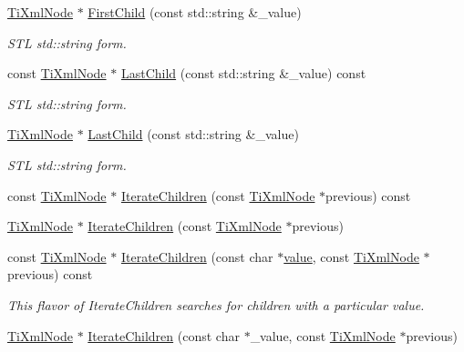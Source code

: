 \begin{DoxyCompactItemize}
\hyperlink{class_ti_xml_node}{Ti\+Xml\+Node} $\ast$ \hyperlink{class_ti_xml_node_a10d2669ccb5e29e02fcb0e4408685ef6}{First\+Child} (const std\+::string \&\+\_\+value)
\begin{DoxyCompactList}\small\item\em S\+TL std\+::string form. \end{DoxyCompactList}\item 
const \hyperlink{class_ti_xml_node}{Ti\+Xml\+Node} $\ast$ \hyperlink{class_ti_xml_node_a96b721f14d5393dac70a0eff0d08520e}{Last\+Child} (const std\+::string \&\+\_\+value) const
\begin{DoxyCompactList}\small\item\em S\+TL std\+::string form. \end{DoxyCompactList}\item 
\hyperlink{class_ti_xml_node}{Ti\+Xml\+Node} $\ast$ \hyperlink{class_ti_xml_node_a69772c9202f70553f940b15c06b07be3}{Last\+Child} (const std\+::string \&\+\_\+value)
\begin{DoxyCompactList}\small\item\em S\+TL std\+::string form. \end{DoxyCompactList}\item 
const \hyperlink{class_ti_xml_node}{Ti\+Xml\+Node} $\ast$ \hyperlink{class_ti_xml_node_a67c3a02b797f08d9a31b2553661257e1}{Iterate\+Children} (const \hyperlink{class_ti_xml_node}{Ti\+Xml\+Node} $\ast$previous) const
\item 
\hyperlink{class_ti_xml_node}{Ti\+Xml\+Node} $\ast$ \hyperlink{class_ti_xml_node_a2358e747118fdbf0e467b1e4f7d03de1}{Iterate\+Children} (const \hyperlink{class_ti_xml_node}{Ti\+Xml\+Node} $\ast$previous)
\item 
const \hyperlink{class_ti_xml_node}{Ti\+Xml\+Node} $\ast$ \hyperlink{class_ti_xml_node_a74bc68a536c279a42af346cb1454f143}{Iterate\+Children} (const char $\ast$\hyperlink{class_ti_xml_node_aead528b3cedc33c16a6c539872c7cc8b}{value}, const \hyperlink{class_ti_xml_node}{Ti\+Xml\+Node} $\ast$previous) const
\begin{DoxyCompactList}\small\item\em This flavor of Iterate\+Children searches for children with a particular \textquotesingle{}value\textquotesingle{}. \end{DoxyCompactList}\item 
\hyperlink{class_ti_xml_node}{Ti\+Xml\+Node} $\ast$ \hyperlink{class_ti_xml_node_a67ba8275e533e6f76340236c42ea0aea}{Iterate\+Children} (const char $\ast$\+\_\+value, const \hyperlink{class_ti_xml_node}{Ti\+Xml\+Node} $\ast$previous)

\end{DoxyCompactItemize}
